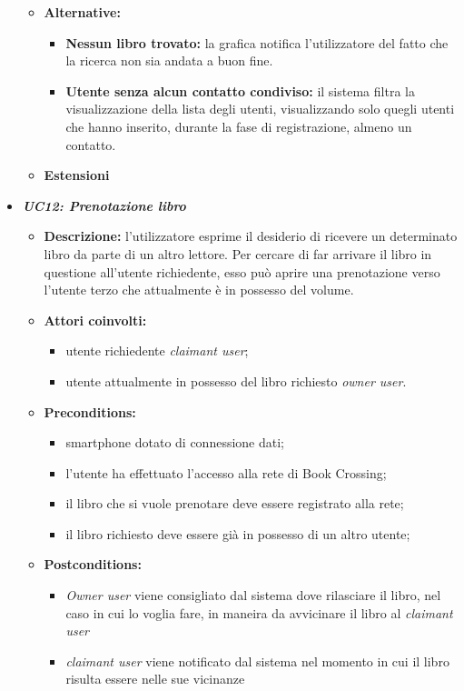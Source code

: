 \begin{itemize}
\begin{itemize}
		\item \textbf{Alternative:}
		\begin{itemize}
			\item \textbf{Nessun libro trovato:} la grafica notifica l'utilizzatore del fatto che la ricerca non sia andata a buon fine.
			\item \textbf{Utente senza alcun contatto condiviso:} il sistema filtra la visualizzazione della lista degli utenti, visualizzando solo quegli utenti che hanno inserito, durante la fase di registrazione, almeno un contatto.
		\end{itemize}
		\item \textbf{Estensioni}
	\end{itemize}
	\item \textbf{\textit{UC12: Prenotazione libro}}
	\begin{itemize}
		\item \textbf{Descrizione:} l'utilizzatore esprime il desiderio di ricevere un determinato libro da parte di un altro lettore. Per cercare di far arrivare il libro in questione all'utente richiedente, esso può aprire una prenotazione verso l'utente terzo che attualmente è in possesso del volume.
		\item \textbf{Attori coinvolti:} 
		\begin{itemize}
			\item utente richiedente \textit{claimant user};
			\item utente attualmente in possesso del libro richiesto \textit{owner user}.
		\end{itemize}
		\item \textbf{Preconditions:}
		\begin{itemize}
			\item smartphone dotato di connessione dati;
			\item l’utente ha effettuato l’accesso alla rete di Book Crossing;
			\item il libro che si vuole prenotare deve essere registrato alla rete;
			\item il libro richiesto deve essere già in possesso di un altro utente;
		\end{itemize}
		\item \textbf{Postconditions:}
		\begin{itemize}
			\item \textit{Owner user} viene consigliato dal sistema dove rilasciare il libro, nel caso in cui lo voglia fare, in maneira da avvicinare il libro al \textit{claimant user}
			\item \textit{claimant user} viene notificato dal sistema nel momento in cui il libro risulta essere nelle sue vicinanze

\end{itemize}
\end{itemize}
\end{itemize}
